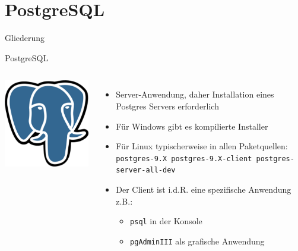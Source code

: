 \documentclass[18pt]{beamer}
\begin{document}
\section{PostgreSQL}

\begin{frame}{Gliederung}
\tableofcontents[currentsection]
\end{frame}

\begin{frame}{PostgreSQL}

\begin{columns}
	\includegraphics[width=0.99\textwidth]{images/postgres} 

	\begin{itemize}
	\item Server-Anwendung, daher Installation eines Postgres Servers erforderlich
    \item Für Windows gibt es kompilierte Installer
    \item Für Linux typischerweise in allen Paketquellen:\\ \texttt{\footnotesize postgres-9.X postgres-9.X-client postgres-server-all-dev}
    \item Der Client ist i.d.R. eine spezifische Anwendung z.B.:
      \begin{itemize}
      \item \texttt{psql} in der Konsole
      \item \texttt{pgAdminIII} als grafische Anwendung
      \end{itemize}
	\end{itemize}
\end{columns}
\end{frame}
\end{document}
